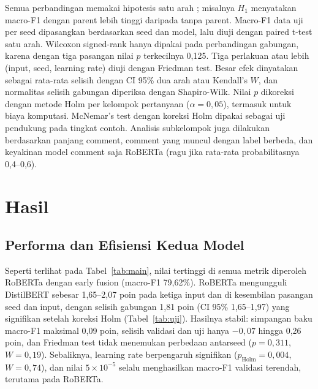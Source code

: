 \documentclass[conference]{IEEEtran}
\begin{document}
Semua perbandingan memakai hipotesis satu arah \cite{dror2020significance}; misalnya $H_1$ menyatakan macro-F1 dengan parent lebih tinggi daripada tanpa parent. Macro-F1 data uji per seed dipasangkan berdasarkan seed dan model, lalu diuji dengan paired t-test satu arah. Wilcoxon signed-rank hanya dipakai pada perbandingan gabungan, karena dengan tiga pasangan nilai $p$ terkecilnya 0,125. Tiga perlakuan atau lebih (input, seed, learning rate) diuji dengan Friedman test. Besar efek dinyatakan sebagai rata-rata selisih dengan CI 95\% dua arah atau Kendall's $W$, dan normalitas selisih gabungan diperiksa dengan Shapiro-Wilk. Nilai $p$ dikoreksi dengan metode Holm per kelompok pertanyaan ($\alpha = 0{,}05$), termasuk untuk biaya komputasi. McNemar's test dengan koreksi Holm dipakai sebagai uji pendukung pada tingkat contoh. Analisis subkelompok juga dilakukan berdasarkan panjang comment, comment yang muncul dengan label berbeda, dan keyakinan model comment saja RoBERTa (ragu jika rata-rata probabilitasnya 0,4--0,6).

\section{Hasil}

\subsection{Performa dan Efisiensi Kedua Model}
Seperti terlihat pada Tabel~\ref{tab:main}, nilai tertinggi di semua metrik diperoleh RoBERTa dengan early fusion (macro-F1 79,62\%). RoBERTa mengungguli DistilBERT sebesar 1,65--2,07 poin pada ketiga input dan di kesembilan pasangan seed dan input, dengan selisih gabungan 1,81 poin (CI 95\% 1,65--1,97) yang signifikan setelah koreksi Holm (Tabel~\ref{tab:uji}). Hasilnya stabil: simpangan baku macro-F1 maksimal 0,09 poin, selisih validasi dan uji hanya $-0{,}07$ hingga 0,26 poin, dan Friedman test tidak menemukan perbedaan antarseed ($p = 0{,}311$, $W = 0{,}19$). Sebaliknya, learning rate berpengaruh signifikan ($p_{\mathrm{Holm}} = 0{,}004$, $W = 0{,}74$), dan nilai $5 \times 10^{-5}$ selalu menghasilkan macro-F1 validasi terendah, terutama pada RoBERTa.
\end{document}
